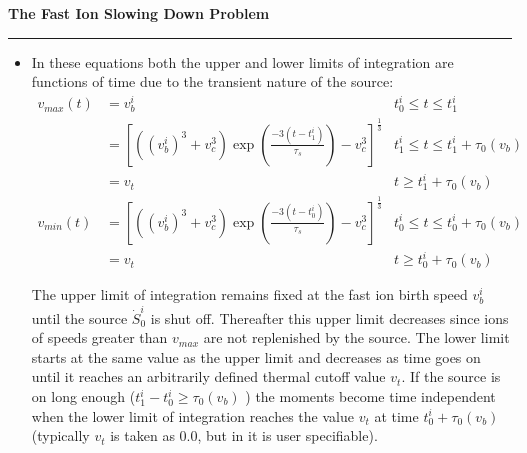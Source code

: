      \begin{slide}          \setlength{\topmargin}{-0.5in}
       \begin{center}
           \Large\bfseries The Fast Ion Slowing Down Problem 
        \end{center}
        \normalsize  

        \bigskip
        \hrule height4pt

         \begin{itemize} \bfseries \tiny
           \item
       In these equations  both the upper and lower limits of
       integration are functions of time due to the transient
       nature of the source:
       \begin{align}
          v_{max}(t) & = v_b^i &  t_0^i\le t \le t_1^i \\
                     & = [((v_b^i)^3
                     +v_c^3)\exp(\frac{-3(t-t_1^i)}{\tau_s})
                    -v_c^3]^{\frac{1}{3}} &t_1^i \le t \le
                    t_1^i+\tau_0(v_b) \\
                    & = v_t & t \ge t_1^i+\tau_0(v_b) \\
          v_{min}(t) & =  [((v_b^i)^3
                     +v_c^3)\exp(\frac{-3(t-t_0^i)}{\tau_s})
                     -v_c^3]^{\frac{1}{3}}  &t_0^i \le t \le
                    t_0^i+\tau_0(v_b) \\
                     & = v_t & t \ge t_0^i+\tau_0(v_b)
       \end{align}

       The upper limit
       of integration remains fixed at the fast ion birth speed
       $v_b^i$
       until the source $ \dot S_0^i $ is shut off.  Thereafter this
       upper limit decreases  since ions of speeds greater than $
       v_{max} $ are not replenished by the source. 
       The lower limit
       starts at the same value as the upper limit and decreases as
       time goes on until it reaches an arbitrarily defined thermal
       cutoff value $ v_t $.
       If the source is on long enough ($ t_1^i -t_0^i \ge
       \tau_0(v_b)$ ) the moments 
       become time independent when the lower limit of 
       integration  reaches the value $ v_t $ at time $t_0^i +\tau_0(v_b)$
       (typically $v_t$ is taken as 0.0, but in \ot it is user
       specifiable).     
    \end{itemize}
    \end{slide}


